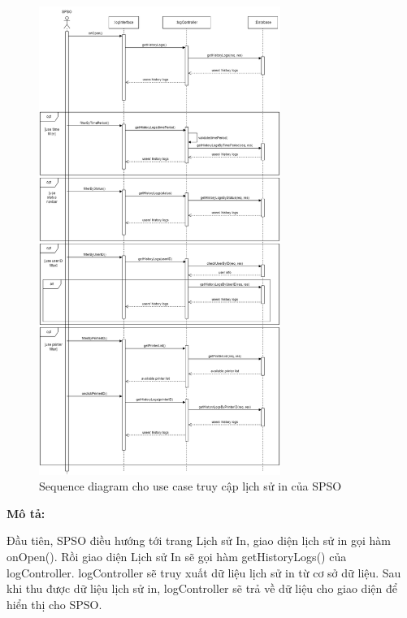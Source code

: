 \begin{figure}[H]
    \begin{center}
        \includegraphics[width=0.7\textwidth]{Images/System Modelling/Logging(SPSO)_Sequence(1).png}
        \caption{Sequence diagram cho use case truy cập lịch sử in của SPSO}
        \label{fig:arch}
    \end{center}
\end{figure}

\textbf{Mô tả:}\par

Đầu tiên, SPSO điều hướng tới trang Lịch sử In, giao diện lịch sử in gọi hàm onOpen(). Rồi giao diện Lịch sử In sẽ gọi hàm getHistoryLogs() của logController. logController sẽ truy xuất dữ liệu lịch sử in từ cơ sở dữ liệu. Sau khi thu được dữ liệu lịch sử in, logController sẽ trả về dữ liệu cho giao diện để hiển thị cho SPSO. \par

